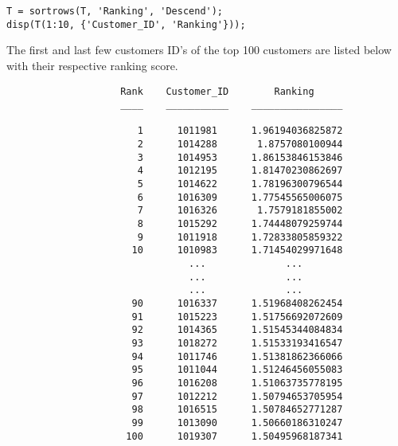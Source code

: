 \begin{lstlisting}
T = sortrows(T, 'Ranking', 'Descend');
disp(T(1:10, {'Customer_ID', 'Ranking'}));
\end{lstlisting}

\noindent
The first and last few customers ID's of the top 100 customers are listed below with their respective ranking score.

\begin{lstlisting}
                    Rank    Customer_ID        Ranking                                    
                    ____    ___________    ________________                               

                       1      1011981      1.96194036825872                               
                       2      1014288       1.8757080100944                               
                       3      1014953      1.86153846153846                               
                       4      1012195      1.81470230862697                               
                       5      1014622      1.78196300796544                               
                       6      1016309      1.77545565006075                               
                       7      1016326       1.7579181855002                               
                       8      1015292      1.74448079259744                               
                       9      1011918      1.72833805859322                               
                      10      1010983      1.71454029971648                               
                                ...              ...                                      
                                ...              ...                                      
                                ...              ...                                      
                      90      1016337      1.51968408262454                               
                      91      1015223      1.51756692072609                               
                      92      1014365      1.51545344084834                               
                      93      1018272      1.51533193416547                               
                      94      1011746      1.51381862366066                               
                      95      1011044      1.51246456055083                               
                      96      1016208      1.51063735778195                               
                      97      1012212      1.50794653705954                               
                      98      1016515      1.50784652771287                               
                      99      1013090      1.50660186310247                               
                     100      1019307      1.50495968187341                               
\end{lstlisting}

